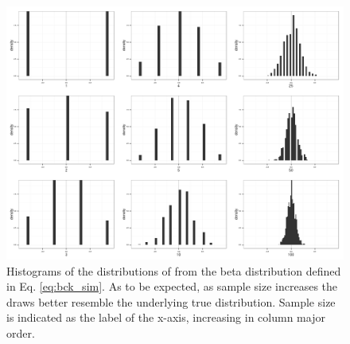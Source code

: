 \documentclass[12pt,letterpaper]{article}
\begin{document}

\begin{figure}[ht]
  \centering
  \includegraphics[height = \textheight,width=\textwidth,keepaspectratio=true]{figure/env_mode_dist}
  \caption{Histograms of the distributions of from the beta distribution defined in Eq. \ref{eq:bck_sim}. As to be expected, as sample size increases the draws better resemble the underlying true distribution. Sample size is indicated as the label of the x-axis, increasing in column major order.}
  \label{fig:env_mode}
\end{figure}
\end{document}
